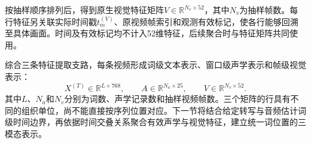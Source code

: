 按抽样顺序排列后，得到原生视觉特征矩阵$V\in\mathbb{R}^{N_v\times52}$，其中$N_v$为抽样帧数。每行特征另关联实际时间戳$t_m^{(V)}$、原视频帧索引和观测有效标记，使各行能够回溯至具体画面。时间及有效标记均不计入52维特征，后续聚合时与特征矩阵共同使用。

综合三条特征提取支路，每条视频形成词级文本表示、窗口级声学表示和帧级视觉表示：
\begin{equation}
    X^{(T)}\in\mathbb{R}^{L\times768},\qquad
    A\in\mathbb{R}^{N_a\times25},\qquad
    V\in\mathbb{R}^{N_v\times52}.
    \label{eq:p1_native_features}
\end{equation}
其中$L$、$N_a$和$N_v$分别为词数、声学记录数和抽样视频帧数。三个矩阵的行具有不同的组织单位，尚不能直接按序列位置对应。下一节将结合给定转写与音频估计词级时间边界，再依据时间交叠关系聚合有效声学与视觉特征，建立统一词位置的三模态表示。
